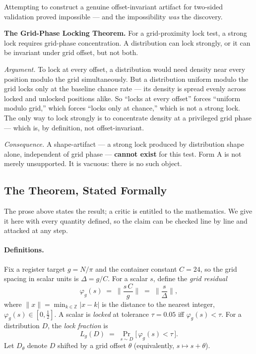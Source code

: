 \documentclass[11pt, letterpaper, openany]{book}
\begin{document}
Attempting to construct a genuine offset-invariant artifact for two-sided validation proved
impossible --- and the impossibility \emph{was} the discovery.
 
\begin{refutebox}
\textbf{The Grid-Phase Locking Theorem.} For a grid-proximity lock test, a strong lock
requires grid-phase concentration. A distribution can lock strongly, or it can be invariant
under grid offset, but not both.
 
\textit{Argument.} To lock at every offset, a distribution would need density near every
position modulo the grid simultaneously. But a distribution uniform modulo the grid locks
only at the baseline chance rate --- its density is spread evenly across locked and unlocked
positions alike. So ``locks at every offset'' forces ``uniform modulo grid,'' which forces
``locks only at chance,'' which is not a strong lock. The only way to lock strongly is to
concentrate density at a privileged grid phase --- which is, by definition, not
offset-invariant.
 
\textit{Consequence.} A shape-artifact --- a strong lock produced by distribution shape
alone, independent of grid phase --- \textbf{cannot exist} for this test. Form A is not
merely unsupported. It is vacuous: there is no such object.
\end{refutebox}
 
\subsection{The Theorem, Stated Formally}
\label{sec:theorem_formal}
 
The prose above states the result; a critic is entitled to the mathematics. We give it here
with every quantity defined, so the claim can be checked line by line and attacked at any step.
 
\paragraph{Definitions.} Fix a register target $g = N/\pi$ and the container constant $C = 24$,
so the grid spacing in scalar units is $\Delta = g/C$. For a scalar $s$, define the
\emph{grid residual}
\[
  \varphi_g(s) \;=\; \Big\lVert \frac{s\,C}{g} \Big\rVert
  \;=\; \Big\lVert \frac{s}{\Delta} \Big\rVert,
\]
where $\lVert x \rVert = \min_{k\in\mathbb{Z}} |x-k|$ is the distance to the nearest integer,
$\varphi_g(s) \in [0, \tfrac12]$. A scalar is \emph{locked} at tolerance $\tau = 0.05$ iff
$\varphi_g(s) < \tau$. For a distribution $D$, the \emph{lock fraction} is
\[
  L_g(D) \;=\; \Pr_{s\sim D}\!\big[\, \varphi_g(s) < \tau \,\big].
\]
Let $D_\theta$ denote $D$ shifted by a grid offset $\theta$ (equivalently, $s \mapsto s+\theta$).
 
\end{document}
